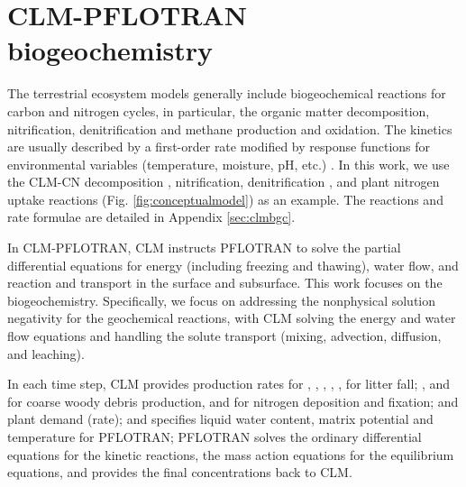 \documentclass[gmd, manuscript]{copernicus}
\begin{document}
\section{CLM-PFLOTRAN biogeochemistry}
The terrestrial ecosystem models generally include biogeochemical reactions for
carbon and nitrogen cycles, in particular, the organic matter decomposition,
nitrification, denitrification and methane production and oxidation. The
kinetics are usually described by a first-order rate modified by response
functions for environmental variables (temperature, moisture, pH, etc.)
\citep{Bonan2012,Boyer2006,Schmidt2011}.  In this work, we use the CLM-CN
decomposition \citep{Bonan2012,Oleson2013,Thornton2005}, nitrification,
denitrification \citep{Dickinson2002,Parton2001,Parton1996}, and plant nitrogen
uptake reactions (Fig. \ref{fig:conceptualmodel}) as an example. The reactions
and rate formulae are detailed in Appendix \ref{sec:clmbgc}.


In CLM-PFLOTRAN, CLM instructs PFLOTRAN to solve the partial differential
equations for energy (including freezing and thawing), water flow, and reaction
and transport in the surface and subsurface. This work focuses on the
biogeochemistry. %
Specifically, we focus on addressing the nonphysical
solution negativity for the geochemical reactions, with CLM solving the energy and water
flow equations and handling the solute transport (mixing, advection, diffusion,
and leaching).

In each time step, CLM provides production rates for ,
, , , ,  for litter
fall; , and  for coarse woody debris production,
 and  for nitrogen deposition and fixation; and
plant  demand (rate); and specifies liquid water content, matrix
potential and temperature for PFLOTRAN; PFLOTRAN solves the ordinary differential
equations for the kinetic reactions, the mass action equations for the
equilibrium equations, and provides the final concentrations back
to CLM.   
\end{document}
